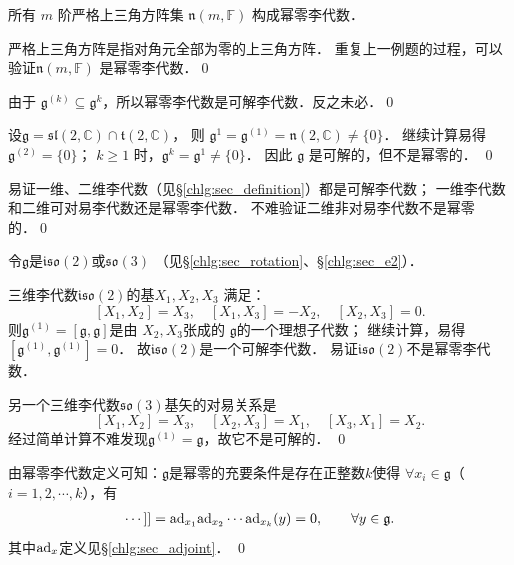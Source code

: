 \begin{example}
    所有 $m$ 阶严格上三角方阵集 $\mathfrak{n}(m, \mathbb{F})$ 构成幂零李代数．
\end{example}
严格上三角方阵是指对角元全部为零的上三角方阵．
重复上一例题的过程，可以验证$\mathfrak{n}(m, \mathbb{F})$ 是幂零李代数．\qed

\begin{example}
    由于 $\mathfrak{g}^{(k)} \subseteq \mathfrak{g}^k$，所以幂零李代数是可解李代数．反之未必．\qed   
\end{example}

\begin{example}
    设$\mathfrak{g}=\mathfrak{sl}(2, \mathbb{C}) \cap \mathfrak{t}(2, \mathbb{C})$，
    则 $\mathfrak{g}^1=\mathfrak{g}^{(1)}=\mathfrak{n}(2, \mathbb{C}) \neq\{0\}$．
    继续计算易得 $\mathfrak{g}^{(2)}=\{0\}$；
    $k \geqslant 1$ 时，$\mathfrak{g}^k=\mathfrak{g}^1 \neq\{0\}$． 
    因此 $\mathfrak{g}$ 是可解的，但不是幂零的． \qed    
\end{example}

\begin{example}
    易证一维、二维李代数（见\S\ref{chlg:sec_definition}）都是可解李代数；
    一维李代数和二维可对易李代数还是幂零李代数．
    不难验证二维非对易李代数不是幂零的．\qed   
\end{example}


\begin{example}
    令$\mathfrak{g}$是$\mathfrak{iso}(2)$或$\mathfrak{so}(3)$
    （见\S\ref{chlg:sec_rotation}、\S\ref{chlg:sec_e2}）．
\end{example}
三维李代数$\mathfrak{iso}(2)$的基$X_1, X_2, X_3$ 满足：
\begin{equation*}
    \left[X_1, X_2\right]=X_3,\quad \left[X_1, X_3\right]=-X_2,\quad \left[X_2, X_3\right]=0.
\end{equation*}
则$\mathfrak{g}^{(1)}=[\mathfrak{g}, \mathfrak{g}]$是由 $X_2, X_3$张成的
$\mathfrak{g}$的一个理想子代数；
继续计算，易得$\left[\mathfrak{g}^{(1)}, \mathfrak{g}^{(1)}\right]=0$．
故$\mathfrak{iso}(2)$是一个可解李代数．
易证$\mathfrak{iso}(2)$不是幂零李代数．

另一个三维李代数$\mathfrak{so}(3)$基矢的对易关系是
\begin{equation*}
    \left[X_1, X_2\right]=X_3,\quad \left[X_2, X_3\right]=X_1,\quad \left[X_3, X_1\right]=X_2 .
\end{equation*}
经过简单计算不难发现$\mathfrak{g}^{(1)}=\mathfrak{g}$，故它不是可解的． \qed


\begin{example}
    由幂零李代数定义可知：$\mathfrak{g}$是幂零的充要条件是存在正整数$k$使得
    $\forall x_i\in \mathfrak{g}$（$i=1,2,\cdots,k$），有
    \begin{align*}
        [x_1,[x_2,\cdots, [{x_k},y]\cdots ]]
        ={\rm ad}_{x_1} {\rm ad}_{x_2}\cdots {\rm ad}_{x_k} (y) =0 ,
        \qquad \forall y\in \mathfrak{g} .
    \end{align*}
    其中${\rm ad}_{x}$定义见\S \ref{chlg:sec_adjoint}． \qed
\end{example}


